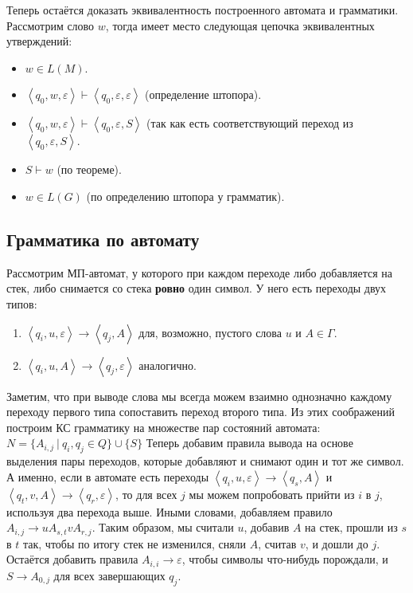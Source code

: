 Теперь остаётся доказать эквивалентность построенного автомата и грамматики. Рассмотрим слово $w$, тогда имеет место следующая цепочка эквивалентных утверждений:
\begin{itemize}
    \item $w \in L(M)$.
    \item $\left<q_0, w, \varepsilon \right> \vdash \left<q_0, \varepsilon, \varepsilon \right>$ (определение штопора).
    \item $\left<q_0, w, \varepsilon \right> \vdash \left<q_0, \varepsilon, S \right>$ (так как есть соответствующий переход из $\left<q_0, \varepsilon, S \right>$.
    \item $S \vdash w$ (по теореме).
    \item $w \in L(G)$ (по определению штопора у грамматик).
\end{itemize}

\subsection{Грамматика по автомату}
Рассмотрим МП-автомат, у которого при каждом переходе либо добавляется на стек, либо снимается со стека \textbf{ровно} один символ.
У него есть переходы двух типов:
\begin{enumerate}
    \item $\left<q_i, u, \varepsilon \right> \to \left<q_j, A\right>$ для, возможно, пустого слова $u$ и $A \in \Gamma$.
    \item $\left<q_i, u, A \right> \to \left<q_j, \varepsilon \right>$ аналогично.
\end{enumerate}
Заметим, что при выводе слова мы всегда можем взаимно однозначно каждому переходу первого типа сопоставить переход второго типа.
Из этих соображений построим КС грамматику на множестве пар состояний автомата: $N = \{A_{i,j}~|~q_i,q_j \in Q\} \cup \{S\}$
Теперь добавим правила вывода на основе выделения пары переходов, которые добавляют и снимают один и тот же символ.
А именно, если в автомате есть переходы $\left<q_i, u, \varepsilon \right> \to \left<q_s, A \right>$ и $\left<q_t, v, A \right> \to \left<q_r, \varepsilon \right>$, то для всех $j$ мы можем попробовать прийти из $i$ в $j$, используя два перехода выше.
Иными словами, добавляем правило $A_{i,j} \to u A_{s,t} v A_{r,j}$.
Таким образом, мы считали $u$, добавив $A$ на стек, прошли из $s$ в $t$ так, чтобы по итогу стек не изменился, сняли $A$, считав $v$, и дошли до $j$.
Остаётся добавить правила $A_{i,i} \to \varepsilon$, чтобы символы что-нибудь порождали, и $S \to A_{0,j}$ для всех завершающих $q_j$.

